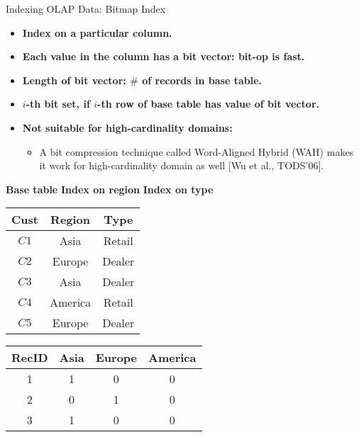 \begin{frame}{Indexing OLAP Data: Bitmap Index}
	\begin{itemize}
		\item \textbf{Index on a particular column.}
		\item \textbf{Each value in the column has a bit vector: bit-op is fast.}
		\item \textbf{Length of bit vector: $\#$ of records in base table.}
		\item \textbf{$i$-th bit set, if $i$-th row of base table has value of bit vector.}
		\item \textbf{Not suitable for high-cardinality domains:}
		      \begin{itemize}
			      \item A bit compression technique called Word-Aligned Hybrid (WAH) makes it work for high-cardinality domain as well [Wu et al., TODS'06].
		      \end{itemize}
	\end{itemize}
	\centering
	\textbf{Base table} \hspace{2.5cm} \textbf{Index on region} \hspace{2.5cm} \textbf{Index on type}\\
	\begin{tabular}{| c | c | c |}
		\hline
		\textbf{Cust} & \textbf{Region} & \textbf{Type} \\\hline
		$C1$          & Asia            & Retail        \\\hline
		$C2$          & Europe          & Dealer        \\\hline
		$C3$          & Asia            & Dealer        \\\hline
		$C4$          & America         & Retail        \\\hline
		$C5$          & Europe          & Dealer        \\\hline
	\end{tabular}\hspace{0.1cm}
	\begin{tabular}{| c | c | c | c |}
		\hline
		\textbf{RecID} & \textbf{Asia} & \textbf{Europe} & \textbf{America} \\\hline
		1              & 1             & 0               & 0                \\\hline
		2              & 0             & 1               & 0                \\\hline
		3              & 1             & 0               & 0                \\\hline

\end{tabular}
\end{frame}
